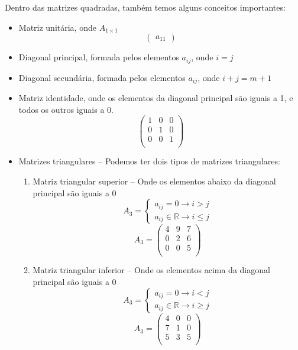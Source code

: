 \documentclass[12pt]{article}
\begin{document}
Dentro das matrizes quadradas, também temos alguns conceitos importantes:
\begin{itemize}
    \item Matriz unitária, onde $A_{1 \times 1}$
    \[
    \begin{pmatrix}
        a_{11}
    \end{pmatrix}
    \]
    \item Diagonal principal, formada pelos elementos $a_{ij}$, onde $i = j$
    \item Diagonal secundária, formada pelos elementos $a_{ij}$, onde 
    $i+j = m + 1$ 
    \item Matriz identidade, onde os elementos da diagonal principal são 
    iguais a 1, e todos os outros iguais a 0.
    \[
    \begin{pmatrix}
        1 & 0 & 0 \\
        0 & 1 & 0 \\
        0 & 0 & 1 \\
    \end{pmatrix}
    \]
    \item Matrizes triangulares -- Podemos ter dois tipos de matrizes 
    triangulares:
    \begin{enumerate}
        \item Matriz triangular superior -- Onde os elementos abaixo da 
        diagonal principal são iguais a 0
        \[
        A_3 = \left\{
        \begin{array}{l}
            a_{ij} = 0 \rightarrow i > j \\
            a_{ij} \in \mathbb{R} \rightarrow i \leq j
        \end{array} \right.
        \]
        \[ A_3 = 
        \begin{pmatrix}
            4 & 9 & 7 \\
            0 & 2 & 6 \\
            0 & 0 & 5 \\
        \end{pmatrix}
        \]
        \item Matriz triangular inferior -- Onde os elementos acima da 
        diagonal principal são iguais a 0
        \[
        A_3 = \left\{
        \begin{array}{l}
            a_{ij} = 0 \rightarrow i < j \\
            a_{ij} \in \mathbb{R} \rightarrow i \geq j
        \end{array} \right.
        \]
        \[ A_3 = 
        \begin{pmatrix}
            4 & 0 & 0 \\
            7 & 1 & 0 \\
            5 & 3 & 5 \\
        \end{pmatrix}
        \]
    \end{enumerate}
\end{itemize} 
\end{document}
